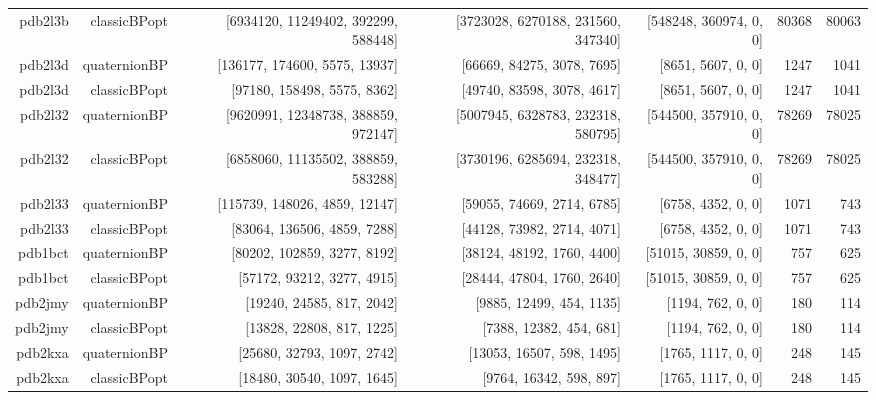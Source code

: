 \documentclass[a4paper,10pt]{article}
\begin{document}
{{\begin{tabular}{rrrrrrr}
pdb2l3b & classicBPopt & [6934120, 11249402, 392299, 588448] & [3723028, 6270188, 231560, 347340] & [548248, 360974, 0, 0] & 80368 & 80063 \\
pdb2l3d & quaternionBP & [136177, 174600, 5575, 13937] & [66669, 84275, 3078, 7695] & [8651, 5607, 0, 0] & 1247 & 1041 \\
pdb2l3d & classicBPopt & [97180, 158498, 5575, 8362] & [49740, 83598, 3078, 4617] & [8651, 5607, 0, 0] & 1247 & 1041 \\
pdb2l32 & quaternionBP & [9620991, 12348738, 388859, 972147] & [5007945, 6328783, 232318, 580795] & [544500, 357910, 0, 0] & 78269 & 78025 \\
pdb2l32 & classicBPopt & [6858060, 11135502, 388859, 583288] & [3730196, 6285694, 232318, 348477] & [544500, 357910, 0, 0] & 78269 & 78025 \\
pdb2l33 & quaternionBP & [115739, 148026, 4859, 12147] & [59055, 74669, 2714, 6785] & [6758, 4352, 0, 0] & 1071 & 743 \\
pdb2l33 & classicBPopt & [83064, 136506, 4859, 7288] & [44128, 73982, 2714, 4071] & [6758, 4352, 0, 0] & 1071 & 743 \\
pdb1bct & quaternionBP & [80202, 102859, 3277, 8192] & [38124, 48192, 1760, 4400] & [51015, 30859, 0, 0] & 757 & 625 \\
pdb1bct & classicBPopt & [57172, 93212, 3277, 4915] & [28444, 47804, 1760, 2640] & [51015, 30859, 0, 0] & 757 & 625 \\
pdb2jmy & quaternionBP & [19240, 24585, 817, 2042] & [9885, 12499, 454, 1135] & [1194, 762, 0, 0] & 180 & 114 \\
pdb2jmy & classicBPopt & [13828, 22808, 817, 1225] & [7388, 12382, 454, 681] & [1194, 762, 0, 0] & 180 & 114 \\
pdb2kxa & quaternionBP & [25680, 32793, 1097, 2742] & [13053, 16507, 598, 1495] & [1765, 1117, 0, 0] & 248 & 145 \\
pdb2kxa & classicBPopt & [18480, 30540, 1097, 1645] & [9764, 16342, 598, 897] & [1765, 1117, 0, 0] & 248 & 145 \\\hline\hline
\end{tabular}
}
}
\end{document}
